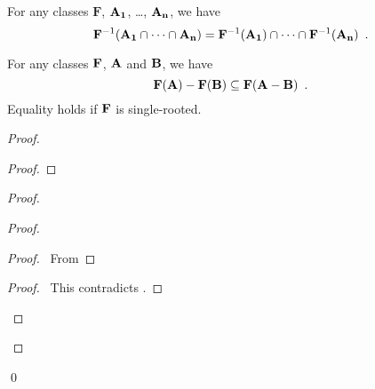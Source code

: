 \begin{corollary}[Pairing]
    For any classes $\mathbf{F}$, $\mathbf{A_1}$, \ldots, $\mathbf{A_n}$, we have
    \[ {\mathbf{F}}^{-1}(\mathbf{A_1} \cap \cdots \cap \mathbf{A_n}) = {\mathbf{F}}^{-1}(\mathbf{A_1}) \cap \cdots \cap {\mathbf{F}}^{-1}(\mathbf{A_n}) \enspace . \]
\end{corollary}

\begin{theorem}[Pairing]
    For any classes $\mathbf{F}$, $\mathbf{A}$ and $\mathbf{B}$, we have
    \[ \mathbf{F}(\mathbf{A}) - \mathbf{F}(\mathbf{B}) \subseteq \mathbf{F}(\mathbf{A} - \mathbf{B}) \enspace . \]
    Equality holds if $\mathbf{F}$ is single-rooted.
\end{theorem}

\begin{proof}
    \pf
    \begin{proof}
    \end{proof}
    \begin{proof}
        \begin{proof}
            \begin{proof}
                \pf\ From 
            \end{proof}
            \qedstep
            \begin{proof}
                \pf\ This contradicts .
            \end{proof}
        \end{proof}
    \end{proof}
    \qed
\end{proof}


